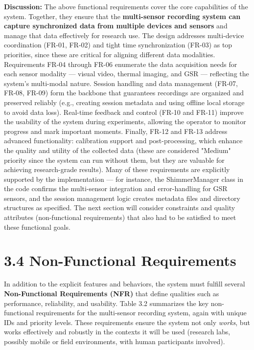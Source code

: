 \documentclass[11pt,a4paper]{report}
\begin{document}
\textbf{Discussion:} The above functional requirements cover the core
capabilities of the system. Together, they ensure that the
\textbf{multi-sensor recording system can capture synchronized data from
multiple devices and sensors} and manage that data effectively for
research use. The design addresses multi-device coordination (FR-01,
FR-02) and tight time synchronization (FR-03) as top priorities, since
these are critical for aligning different data modalities. Requirements
FR-04 through FR-06 enumerate the data acquisition needs for each sensor
modality --- visual video, thermal imaging, and GSR --- reflecting the
system's multi-modal nature. Session handling and data management
(FR-07, FR-08, FR-09) form the backbone that guarantees recordings are
organized and preserved reliably (e.g., creating session metadata and
using offline local storage to avoid data loss). Real-time feedback and
control (FR-10 and FR-11) improve the usability of the system during
experiments, allowing the operator to monitor progress and mark
important moments. Finally, FR-12 and FR-13 address advanced
functionality: calibration support and post-processing, which enhance
the quality and utility of the collected data (these are considered
"Medium" priority since the system can run without them, but they are
valuable for achieving research-grade results). Many of these
requirements are explicitly supported by the implementation --- for
instance, the ShimmerManager class in the code confirms the
multi-sensor integration and error-handling for GSR
sensors\cite{AppleHealthWatch2019}\cite{Boucsein2012},
and the session management logic creates metadata files and directory
structures as
specified\cite{SamsungHealth2020}\cite{Fowles1981}.
The next section will consider constraints and quality attributes
(non-functional requirements) that also had to be satisfied to meet
these functional goals.

\section{3.4 Non-Functional Requirements}

In addition to the explicit features and behaviors, the system must
fulfill several \textbf{Non-Functional Requirements (NFR)} that define
qualities such as performance, reliability, and usability. Table 3.2
summarizes the key non-functional requirements for the multi-sensor
recording system, again with unique IDs and priority levels. These
requirements ensure the system not only \textit{works}, but works effectively
and robustly in the contexts it will be used (research labs, possibly
mobile or field environments, with human participants involved).
\end{document}
